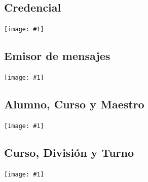 \documentclass[a4paper, 10pt, twoside]{article}
\newcommand{\grafico}[1]{
  \begin{center}
    \texttt{[image: \#1]}
  \end{center}
}
\begin{document}
\subsection{Credencial}

\grafico{diagramas/credencial.png}


\subsection{Emisor de mensajes}

\grafico{diagramas/emisor-de-mensajes.png}


\subsection{Alumno, Curso y Maestro}

\grafico{diagramas/alumno-curso-maestro.png}


\subsection{Curso, División y Turno}

\grafico{diagramas/curso-division-turno.png}
\end{document}
